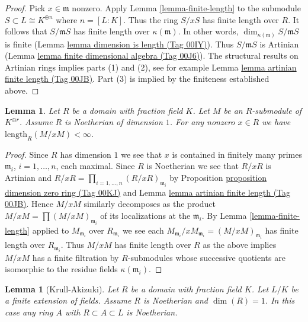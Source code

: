 \documentclass{amsart}
\theoremstyle{plain}
\newtheorem{lemma}[subsection]{Lemma}
\theoremstyle{definition}
\theoremstyle{remark}
\numberwithin{equation}{subsection}
\begin{document}
\begin{proof}
Pick $x \in \mathfrak m$ nonzero. Apply Lemma \ref{lemma-finite-length}
to the submodule $S \subset L \cong K^{\oplus n}$ where $n = [L : K]$.
Thus the ring $S/xS$ has finite length over $R$. It follows that
$S/\mathfrak m S$ has finite length over $\kappa(\mathfrak m)$.
In other words, $\dim_{\kappa(\mathfrak m)} S/\mathfrak m S$
is finite (Lemma \href{https://stacks.math.columbia.edu/tag/00IY}{lemma dimension is length (Tag 00IY)}). Thus $S/\mathfrak mS$
is Artinian (Lemma \href{https://stacks.math.columbia.edu/tag/00J6}{lemma finite dimensional algebra (Tag 00J6)}). The
structural results on Artinian rings implies parts (1) and (2), see
for example Lemma \href{https://stacks.math.columbia.edu/tag/00JB}{lemma artinian finite length (Tag 00JB)}.
Part (3) is implied by the finiteness established above.
\end{proof}


\begin{lemma}
\label{lemma-finite-length-global}
Let $R$ be a domain with fraction field $K$.
Let $M$ be an $R$-submodule of $K^{\oplus r}$.
Assume $R$ is Noetherian of dimension $1$.
For any nonzero $x \in R$ we have
$\text{length}_R(M/xM) < \infty$.
\end{lemma}

\begin{proof}
Since $R$ has dimension $1$ we see that $x$ is contained in finitely many
primes $\mathfrak m_i$, $i = 1, \ldots, n$, each maximal. Since $R$ is
Noetherian we see that $R/xR$ is Artinian and
$R/xR = \prod_{i = 1, \ldots, n} (R/xR)_{\mathfrak m_i}$ by
Proposition \href{https://stacks.math.columbia.edu/tag/00KJ}{proposition dimension zero ring (Tag 00KJ)} and
Lemma \href{https://stacks.math.columbia.edu/tag/00JB}{lemma artinian finite length (Tag 00JB)}. Hence $M/xM$ similarly
decomposes as the product $M/xM = \prod (M/xM)_{\mathfrak m_i}$
of its localizations at the $\mathfrak m_i$. By Lemma \ref{lemma-finite-length}
applied to $M_{\mathfrak m_i}$ over $R_{\mathfrak m_i}$ we see each
$M_{\mathfrak m_i}/xM_{\mathfrak m_i} = (M/xM)_{\mathfrak m_i}$
has finite length over $R_{\mathfrak m_i}$. Thus $M/xM$
has finite length over $R$ as the above implies $M/xM$
has a finite filtration by $R$-submodules whose successive
quotients are isomorphic to the residue fields $\kappa(\mathfrak m_i)$.
\end{proof}


\begin{lemma}[Krull-Akizuki]
\label{lemma-krull-akizuki}
Let $R$ be a domain with fraction field $K$.
Let $L/K$ be a finite extension of fields.
Assume $R$ is Noetherian and $\dim(R) = 1$.
In this case any ring $A$ with $R \subset A \subset L$ is
Noetherian.
\end{lemma}
\end{document}
